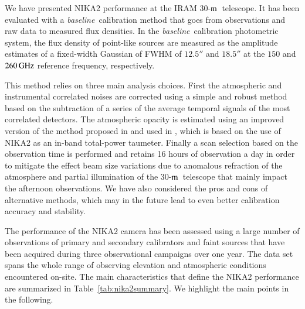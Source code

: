 \documentclass[traditionalabstract]{aa}
\newcommand{\trentemetre}{30-$\rm{m}$}
\newcommand{\baseline}{\emph{baseline}}
\newcommand{\lp}[1]{#1}
\begin{document}
{\lp We have presented NIKA2 performance at the IRAM
  \trentemetre\ telescope. It has been evaluated with a
  \baseline\ calibration method that goes from
  observations and raw data to measured flux densities.
  In the \baseline\ calibration photometric system, the flux
  density of point-like sources are measured as the amplitude estimates
  of a fixed-width Gaussian of FWHM of $12.5''$ and $18.5''$ at the
$150$ and $260\,\rm{GHz}$ reference frequency, respectively.

  This method relies on three main analysis choices. First the
  atmospheric and instrumental correlated noises are corrected using a
  simple and robust method based on the subtraction of a series of
  the average temporal signals of the most correlated detectors. The
  atmospheric opacity is estimated using an improved version of 
  the method proposed in \citet{Catalano2014} and used in
  \citet{Adam2018}, which is based on the use of
  NIKA2 as an in-band total-power taumeter. Finally a scan selection
  based on the observation time is performed and retains 16 hours
  of observation a day in order to mitigate the effect beam size
  variations due to anomalous refraction of the atmosphere and
  partial illumination of the \trentemetre\ telescope that mainly
  impact the afternoon observations. We have also considered the pros
  and cons of alternative methods, which may in the future lead to even
  better calibration accuracy and stability.}

The performance of the NIKA2 camera has been assessed using a large
number of observations of primary and secondary calibrators and faint
sources that have been acquired during three observational campaigns
over one year. The data set spans the whole range of observing
elevation and atmospheric conditions encountered on-site.
The main characteristics that define the NIKA2 performance are
summarized in Table~\ref{tab:nika2summary}. We highlight the main
points in the following.
\end{document}
